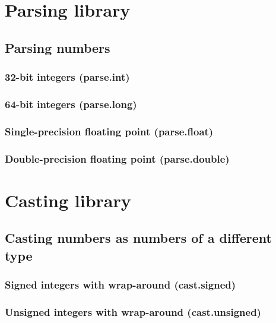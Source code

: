 \documentclass{article}
\theoremstyle{definition}
\begin{document}
\pagebreak

\section{Parsing library}

\subsection{Parsing numbers}

\subsubsection{32-bit integers (parse.int)}

\subsubsection{64-bit integers (parse.long)}

\subsubsection{Single-precision floating point (parse.float)}

\subsubsection{Double-precision floating point (parse.double)}

\pagebreak

\section{Casting library}

\subsection{Casting numbers as numbers of a different type}

\subsubsection{Signed integers with wrap-around (cast.signed)}

\subsubsection{Unsigned integers with wrap-around (cast.unsigned)}
\end{document}
